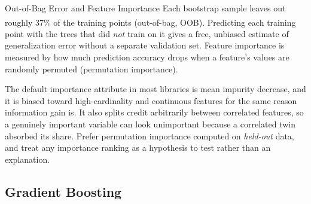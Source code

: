 \begin{v3topic}{Out-of-Bag Error and Feature Importance}
    Each bootstrap sample leaves out roughly 37\% of the training points (out-of-bag, OOB)\textsuperscript{\cite[][p.588]{hanDataMiningConcepts2012}}. Predicting each training point with the trees that did \emph{not} train on it gives a free, unbiased estimate of generalization error without a separate validation set. Feature importance is measured by how much prediction accuracy drops when a feature's values are randomly permuted (permutation importance).

\begin{cautionbox}
The default importance attribute in most libraries is mean impurity decrease,
and it is biased toward high-cardinality and continuous features for the same
reason information gain is. It also splits credit arbitrarily between
correlated features, so a genuinely important variable can look unimportant
because a correlated twin absorbed its share. Prefer permutation importance
computed on \emph{held-out} data, and treat any importance ranking as a
hypothesis to test rather than an explanation.
\end{cautionbox}
\end{v3topic}

\subsection{Gradient Boosting}

